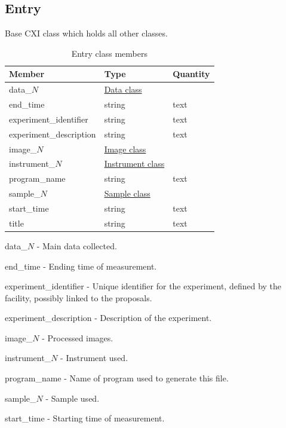 \documentclass[usletter,11pt]{article}
\newcommand{\member}[2]
{ \noindent
{ \color{softBlue}  #1 - } #2
\vspace{0.2cm}
}
\begin{document}
\subsection{Entry}
\label{table:entry}

Base CXI class which holds all other classes.

\begin{table}[h!]\sffamily \footnotesize
\caption{Entry class members}

\begin{tabular}{p{4.5cm} p{4.5cm}  p{2.5cm} }
\toprule
\bfseries Member     & \bfseries Type & \bfseries Quantity \\
\midrule
data\_$N$ & \hyperref[table:data]{Data class} & \\
end\_time  & string & text \\  
experiment\_identifier & string  & text \\
experiment\_description & string & text \\
image\_$N$ & \hyperref[table:image]{Image class} & \\
instrument\_$N$ & \hyperref[table:instrument]{Instrument class} & \\ 
program\_name & string & text \\
sample\_$N$ & \hyperref[table:sample]{Sample class} &  \\
start\_time  & string & text  \\ 
title & string & text \\
\bottomrule
\end{tabular}
\end{table}


\member{data\_$N$}{Main data collected.}

\member{end\_time}{Ending time of measurement.}

\member{experiment\_identifier}{Unique identifier for the experiment,
defined by the facility, possibly linked to the proposals.}

\member{experiment\_description}{Description of the experiment.}

\member{image\_$N$}{Processed images.}

\member{instrument\_$N$}{Instrument used.}

\member{program\_name}{Name of program used to generate this file.}

\member{sample\_$N$}{Sample used.}

\member{start\_time}{Starting time of measurement.}
\end{document}
